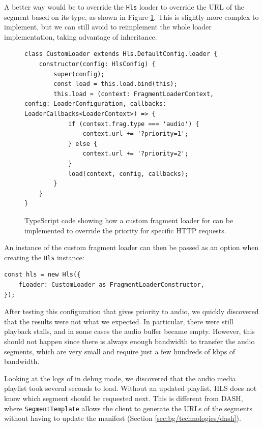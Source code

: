 A better way would be to override the \texttt{Hls} loader to override the URL of the segment based on its type, as shown in Figure \ref{fig:hlsjs_custom_loader}. This is slightly more complex to implement, but we can still avoid to reimplement the whole loader implementation, taking advantage of inheritance.

\begin{figure}
    \centering
    \begin{verbatim}
class CustomLoader extends Hls.DefaultConfig.loader {
    constructor(config: HlsConfig) {
        super(config);
        const load = this.load.bind(this);
        this.load = (context: FragmentLoaderContext, config: LoaderConfiguration, callbacks: LoaderCallbacks<LoaderContext>) => {
            if (context.frag.type === 'audio') {
                context.url += '?priority=1';
            } else {
                context.url += '?priority=2';
            }
            load(context, config, callbacks);
        }
    }
}
\end{verbatim}
    \caption{TypeScript code showing how a custom fragment loader for \hlsjs{} can be implemented to override the priority for specific HTTP requests.}
    \label{fig:hlsjs_custom_loader}
\end{figure}

An instance of the custom fragment loader can then be passed as an option when creating the \texttt{Hls} instance:

\begin{verbatim}
const hls = new Hls({
    fLoader: CustomLoader as FragmentLoaderConstructor,
});
\end{verbatim}

After testing this configuration that gives priority to audio, we quickly discovered that the results were not what we expected. In particular, there were still playback stalls, and in some cases the audio buffer became empty. However, this should not happen since there is always enough bandwidth to transfer the audio segments, which are very small and require just a few hundreds of kbps of bandwidth.

Looking at the logs of \hlsjs{} in debug mode, we discovered that the audio media playlist took several seconds to load. Without an updated playlist, HLS does not know which segment should be requested next. This is different from DASH, where \texttt{SegmentTemplate} allows the client to generate the URLs of the segments without having to update the manifest (Section \ref{sec:bg/technologies/dash}).

